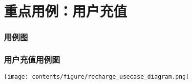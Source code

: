 \section{重点用例：用户充值}
\begin{frame}
    \frametitle{用例图}
    \frametitle{用户充值用例图}
    \center
    \texttt{[image: contents/figure/recharge\_usecase\_diagram.png]}
\end{frame}